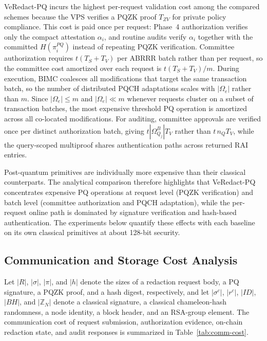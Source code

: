\documentclass[lettersize,journal]{IEEEtran}
\begin{document}
    VeRedact-PQ incurs the highest per-request validation cost among the
    compared schemes because the VPS verifies a PQZK proof $T_{ZV}$ for
    private policy compliance. This cost is paid once per request: Phase~4
    authorization verifies only the compact attestation $\alpha_i$, and
    routine audits verify $\alpha_i$ together with the committed
    $H(\pi_i^{PQ})$ instead of repeating PQZK verification. Committee
    authorization requires $t(T_S+T_V)$ per ABRRR batch rather than per
    request, so the committee cost amortized over each request is
    $t(T_S+T_V)/m$. During execution, BIMC coalesces all modifications that
    target the same transaction batch, so the number of distributed PQCH
    adaptations scales with $|\Omega_e|$ rather than $m$. Since
    $|\Omega_e|\le m$ and $|\Omega_e|\ll m$ whenever requests cluster on a
    subset of transaction batches, the most expensive threshold PQ operation
    is amortized across all co-located modifications. For auditing, committee
    approvals are verified once per distinct authorization batch, giving
    $t|\Omega_{Q_j}^B|T_V$ rather than $t\,n_QT_V$, while the query-scoped
    multiproof shares authentication paths across returned RAI entries.
    
    Post-quantum primitives are individually more expensive than their
    classical counterparts. The analytical comparison therefore highlights
    that VeRedact-PQ concentrates expensive PQ operations at request level
    (PQZK verification) and batch level (committee authorization and PQCH
    adaptation), while the per-request online path is dominated by
    signature verification and hash-based authentication. The experiments
    below quantify these effects with each baseline on its own classical primitives at
    about 128-bit security.
    
    \subsection{Communication and Storage Cost Analysis}
    \label{subsec:communication-cost}
    
    Let $|R|$, $|\sigma|$, $|\pi|$, and $|h|$ denote the sizes of a
    redaction request body, a PQ signature, a PQZK proof, and a hash digest,
    respectively, and let $|\sigma^{c}|$, $|r^{c}|$, $|ID|$, $|BH|$, and
    $|\mathbb{Z}_N|$ denote a classical signature, a classical chameleon-hash
    randomness, a node identity, a block header, and an RSA-group element. The
    communication cost of request submission, authorization evidence,
    on-chain redaction state, and audit responses is summarized in
    Table~\ref{tab:comm-cost}.
    
\end{document}

